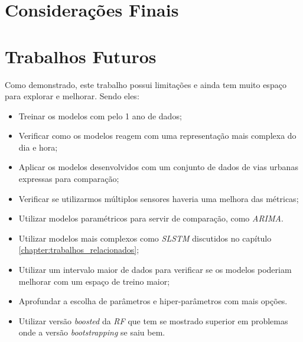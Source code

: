 
\section{Considerações Finais}

\section{Trabalhos Futuros}

Como demonstrado, este trabalho possui limitações e ainda tem muito espaço para explorar e melhorar. Sendo eles:

\begin{itemize}
    \item Treinar os modelos com pelo 1 ano de dados;
    \item Verificar como os modelos reagem com uma representação mais complexa do dia e hora;
    \item Aplicar os modelos desenvolvidos com um conjunto de dados de vias urbanas expressas para comparação;
    \item Verificar se utilizarmos múltiplos sensores haveria uma melhora das métricas;
    \item Utilizar modelos paramétricos para servir de comparação, como \textit{\acrshort{ARIMA}}.
    \item Utilizar modelos mais complexos como \textit{\acrshort{SLSTM}} discutidos no capítulo \ref{chapter:trabalhos_relacionados};
    \item Utilizar um intervalo maior de dados para verificar se os modelos poderiam melhorar com um espaço de treino maior;
    \item Aprofundar a escolha de parâmetros e hiper-parâmetros com mais opções.
    \item Utilizar versão \textit{boosted} da \textit{\acrshort{RF}} que tem se mostrado superior em problemas onde a versão \textit{bootstrapping} se saiu bem.
\end{itemize}